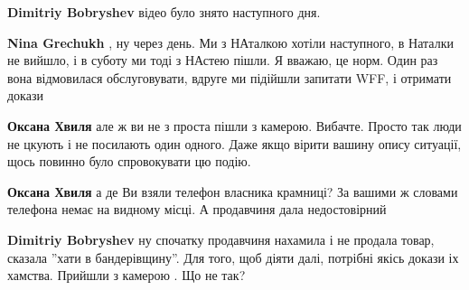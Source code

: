 \begin{itemize}
\begin{itemize}
 
\textbf{Dimitriy Bobryshev} відео було знято наступного дня.

 
\textbf{Nina Grechukh} , ну через день. Ми з НАталкою хотіли наступного, в
Наталки не вийшло, і в суботу ми тоді з НАстею пішли. Я вважаю, це норм. Один
раз вона відмовилася обслуговувати, вдруге ми підійшли запитати WFF, і отримати
докази

 
\textbf{Оксана Хвиля} але ж ви не з проста пішли з камерою. Вибачте. Просто так
люди не цкують і не посилають один одного. Даже якщо вірити вашину опису
ситуації, щось повинно було спровокувати цю подію.

 
\textbf{Оксана Хвиля} а де Ви взяли телефон власника крамниці? За вашими ж
словами телефона немає на видному місці. А продавчиня дала недостовірний

 
\textbf{Dimitriy Bobryshev} ну спочатку продавчиня нахамила і не продала товар,
сказала ''хати в бандерівщину''. Для того, щоб діяти далі, потрібні якісь
докази іх хамства. Прийшли з камерою . Що не так?

 

\end{itemize}
\end{itemize}
